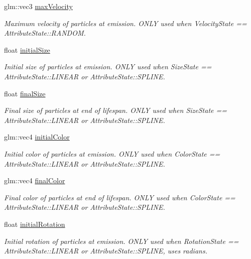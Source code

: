 \begin{DoxyCompactItemize}
glm\+::vec3 \hyperlink{struct_mason_1_1_particle_emitter_config_aa449573ac5e8ae2ef3f5110836a3091c}{max\+Velocity}
\begin{DoxyCompactList}\small\item\em Maximum velocity of particles at emission. O\+N\+LY used when Velocity\+State == Attribute\+State\+::\+R\+A\+N\+D\+OM. \end{DoxyCompactList}\item 
float \hyperlink{struct_mason_1_1_particle_emitter_config_a200875bdd8d24d919160527494c5b611}{initial\+Size}
\begin{DoxyCompactList}\small\item\em Initial size of particles at emission. O\+N\+LY used when Size\+State == Attribute\+State\+::\+L\+I\+N\+E\+AR or Attribute\+State\+::\+S\+P\+L\+I\+NE. \end{DoxyCompactList}\item 
float \hyperlink{struct_mason_1_1_particle_emitter_config_a5aabaa7aa8bd203539a56ee269595f94}{final\+Size}
\begin{DoxyCompactList}\small\item\em Final size of particles at end of lifespan. O\+N\+LY used when Size\+State == Attribute\+State\+::\+L\+I\+N\+E\+AR or Attribute\+State\+::\+S\+P\+L\+I\+NE. \end{DoxyCompactList}\item 
glm\+::vec4 \hyperlink{struct_mason_1_1_particle_emitter_config_a8580419bef5f1d337f75a5224dec0deb}{initial\+Color}
\begin{DoxyCompactList}\small\item\em Initial color of particles at emission. O\+N\+LY used when Color\+State == Attribute\+State\+::\+L\+I\+N\+E\+AR or Attribute\+State\+::\+S\+P\+L\+I\+NE. \end{DoxyCompactList}\item 
glm\+::vec4 \hyperlink{struct_mason_1_1_particle_emitter_config_addf94f6df6c784495840b93aa30ce162}{final\+Color}
\begin{DoxyCompactList}\small\item\em Final color of particles at end of lifespan. O\+N\+LY used when Color\+State == Attribute\+State\+::\+L\+I\+N\+E\+AR or Attribute\+State\+::\+S\+P\+L\+I\+NE. \end{DoxyCompactList}\item 
float \hyperlink{struct_mason_1_1_particle_emitter_config_a94e5a301870aa19cc1bf14d4613cc879}{initial\+Rotation}
\begin{DoxyCompactList}\small\item\em Initial rotation of particles at emission. O\+N\+LY used when Rotation\+State == Attribute\+State\+::\+L\+I\+N\+E\+AR or Attribute\+State\+::\+S\+P\+L\+I\+NE, uses radians. \end{DoxyCompactList}\item 

\end{DoxyCompactItemize}
